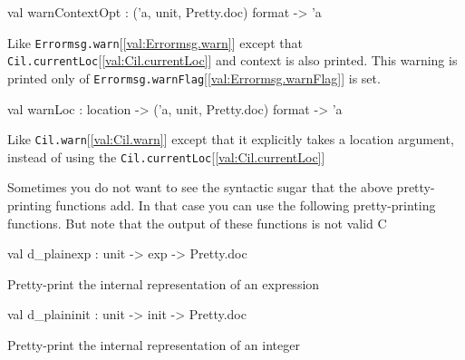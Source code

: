 \documentclass[11pt]{article}
\begin{document}
\label{val:Cil.warnContextOpt}\begin{ocamldoccode}
val warnContextOpt : ('a, unit, Pretty.doc) format -> 'a
\end{ocamldoccode}
\begin{ocamldocdescription}
Like {\tt{Errormsg.warn}}[\ref{val:Errormsg.warn}] except that {\tt{Cil.currentLoc}}[\ref{val:Cil.currentLoc}] and context is also 
 printed. This warning is printed only of {\tt{Errormsg.warnFlag}}[\ref{val:Errormsg.warnFlag}] is set.


\end{ocamldocdescription}




\label{val:Cil.warnLoc}\begin{ocamldoccode}
val warnLoc : location -> ('a, unit, Pretty.doc) format -> 'a
\end{ocamldoccode}
\begin{ocamldocdescription}
Like {\tt{Cil.warn}}[\ref{val:Cil.warn}] except that it explicitly takes a location argument, 
 instead of using the {\tt{Cil.currentLoc}}[\ref{val:Cil.currentLoc}]


\end{ocamldocdescription}




Sometimes you do not want to see the syntactic sugar that the above 
 pretty-printing functions add. In that case you can use the following 
 pretty-printing functions. But note that the output of these functions is 
 not valid C



\label{val:Cil.d-underscoreplainexp}\begin{ocamldoccode}
val d_plainexp : unit -> exp -> Pretty.doc
\end{ocamldoccode}
\begin{ocamldocdescription}
Pretty-print the internal representation of an expression


\end{ocamldocdescription}




\label{val:Cil.d-underscoreplaininit}\begin{ocamldoccode}
val d_plaininit : unit -> init -> Pretty.doc
\end{ocamldoccode}
\begin{ocamldocdescription}
Pretty-print the internal representation of an integer


\end{ocamldocdescription}
\end{document}

